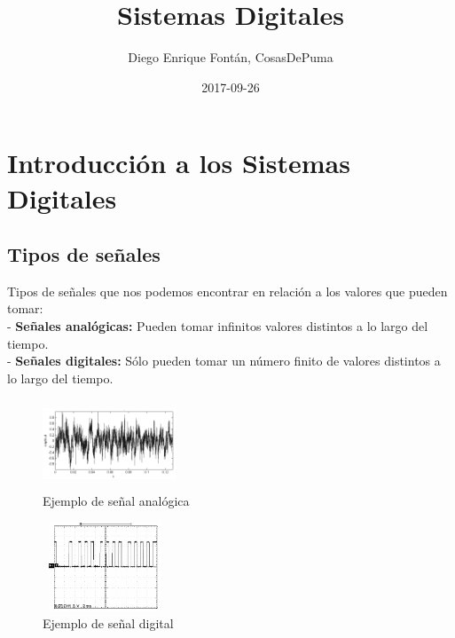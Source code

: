 \documentclass[12pt]{article}
\title{\textbf{Sistemas Digitales}}
\date{2017-09-26}
\author{Diego Enrique Fontán, CosasDePuma}
\begin{document}

	\maketitle
	\newpage
	
	\tableofcontents
	\newpage
	
	
	\section{Introducción a los Sistemas Digitales}
	
		\vfill
	
		\subsection{Tipos de señales}
			
			Tipos de señales que nos podemos encontrar en relación a los valores que pueden tomar:\\
		
			- \textbf{Señales analógicas:} Pueden tomar infinitos valores distintos a lo largo del tiempo.\\
		
			- \textbf{Señales digitales:} Sólo pueden tomar un número finito de valores distintos a lo largo del tiempo.\\
				
			\begin{figure}[H]
			\centering
			\includegraphics[width=150px,height=100px]{analogic}
			\caption{Ejemplo de señal analógica}
			\end{figure}
		
			\begin{figure}[H]
			\centering
			\includegraphics[width=140px,height=100px]{digital}
			\caption{Ejemplo de señal digital}
			\end{figure}
			
\end{document}
